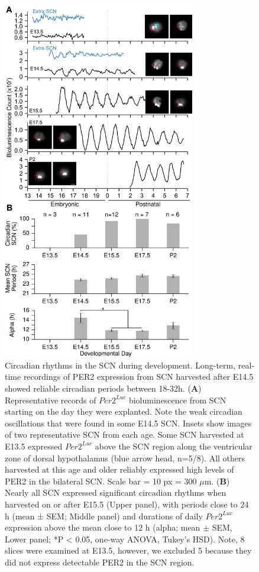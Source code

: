 \begin{figure}[p]
    \begin{center}
        \includegraphics[width=3.3in]{chap4/figures/Figure1.png}
    \end{center}
    \caption{\label{fig:vc1} {\small Circadian rhythms in the SCN during development.  Long-term, real-time recordings of PER2 expression from SCN harvested after E14.5 showed reliable circadian periods between 18-32h. (\textbf{A}) Representative records of $Per2^{Luc}$ bioluminescence from SCN starting on the day they were explanted. Note the weak circadian oscillations that were found in some E14.5 SCN. Insets show images of two representative SCN from each age. Some SCN harvested at E13.5 expressed $Per2^{Luc}$ above the SCN region along the ventricular zone of dorsal hypothalamus (blue arrow head, n=5/8). All others harvested at this age and older reliably expressed high levels of PER2 in the bilateral SCN. Scale bar = 10 px = 300 $\mu$m. (\textbf{B}) Nearly all SCN expressed significant circadian rhythms when harvested on or after E15.5 (Upper panel), with periods close to 24 h (mean ± SEM; Middle panel) and durations of daily $Per2^{Luc}$ expression above the mean close to 12 h (alpha; mean $\pm$ SEM, Lower panel; *P < 0.05, one-way ANOVA, Tukey's HSD). Note, 8 slices were examined at E13.5, however, we excluded 5 because they did not express detectable PER2 in the SCN region.}
    }
\end{figure}

